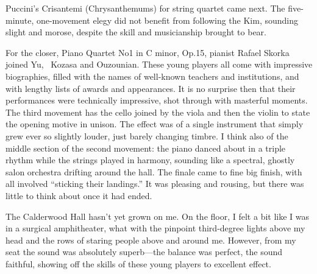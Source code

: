Puccini’s Crisantemi (Chrysanthemums) for string quartet came next. The five-minute, one-movement elegy did not benefit from following the Kim, sounding slight and morose, despite the skill and musicianship brought to bear.

For the closer, Piano Quartet No1 in C minor, Op.15, pianist Rafael Skorka joined Yu,  Kozasa and Ouzounian. These young players all come with impressive biographies, filled with the names of well-known teachers and institutions, and with lengthy lists of awards and appearances. It is no surprise then that their performances were technically impressive, shot through with masterful moments. The third movement has the cello joined by the viola and then the violin to state the opening motive in unison. The effect was of a single instrument that simply grew ever so slightly louder, just barely changing timbre. I think also of the middle section of the second movement: the piano danced about in a triple rhythm while the strings played in harmony, sounding like a spectral, ghostly salon orchestra drifting around the hall. The finale came to fine big finish, with all involved “sticking their landings.” It was pleasing and rousing, but there was little to think about once it had ended.

The Calderwood Hall hasn’t yet grown on me. On the floor, I felt a bit like I was in a surgical amphitheater, what with the pinpoint third-degree lights above my head and the rows of staring people above and around me. However, from my seat the sound was absolutely superb—the balance was perfect, the sound faithful, showing off the skills of these young players to excellent effect.
